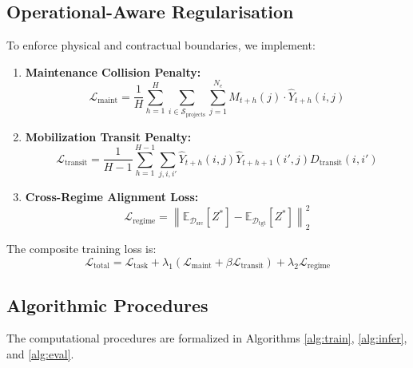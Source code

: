 \documentclass[11pt,a4paper]{article}
\begin{document}
\subsection{Operational-Aware Regularisation}
To enforce physical and contractual boundaries, we implement:
\begin{enumerate}
\item \textbf{Maintenance Collision Penalty:}
\begin{equation}
\mathcal{L}_{\text{maint}} = \frac{1}{H} \sum_{h=1}^H \sum_{i \in \mathcal{S}_{\text{projects}}} \sum_{j=1}^{N_e} M_{t+h}(j) \cdot \widehat{Y}_{t+h}(i, j) \label{eq:maint}
\end{equation}
\item \textbf{Mobilization Transit Penalty:}
\begin{equation}
\mathcal{L}_{\text{transit}} = \frac{1}{H-1} \sum_{h=1}^{H-1} \sum_{j, i, i'} \widehat{Y}_{t+h}(i, j) \widehat{Y}_{t+h+1}(i', j) D_{\text{transit}}(i, i') \label{eq:transit}
\end{equation}
\item \textbf{Cross-Regime Alignment Loss:}
\begin{equation}
\mathcal{L}_{\text{regime}} = \left\| \mathbb{E}_{\mathcal{D}_{\text{src}}}[Z^*] - \mathbb{E}_{\mathcal{D}_{\text{tgt}}}[Z^*] \right\|_2^2 \label{eq:regime}
\end{equation}
\end{enumerate}
The composite training loss is:
\begin{equation}
\mathcal{L}_{\text{total}} = \mathcal{L}_{\text{task}} + \lambda_1 \left(\mathcal{L}_{\text{maint}} + \beta \mathcal{L}_{\text{transit}}\right) + \lambda_2 \mathcal{L}_{\text{regime}} \label{eq:total_loss}
\end{equation}

\subsection{Algorithmic Procedures}
The computational procedures are formalized in Algorithms \ref{alg:train}, \ref{alg:infer}, and \ref{alg:eval}.
\end{document}
